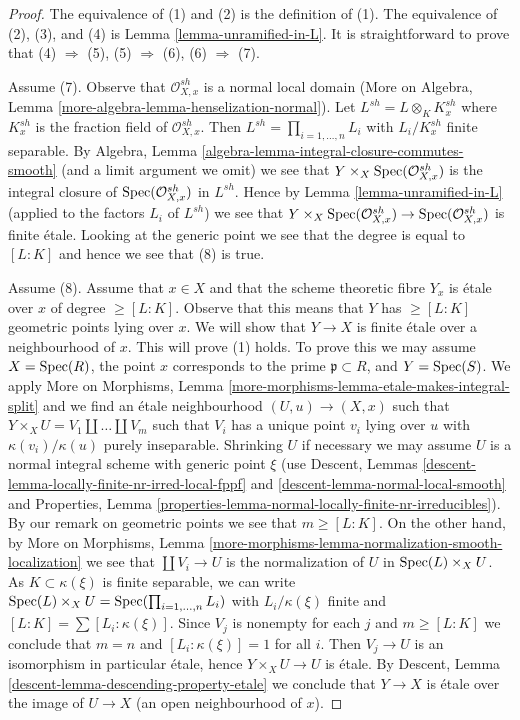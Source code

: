 \begin{proof}
The equivalence of (1) and (2) is the definition of (1).
The equivalence of (2), (3), and (4) is Lemma \ref{lemma-unramified-in-L}.
It is straightforward to prove that (4) $\Rightarrow$ (5),
(5) $\Rightarrow$ (6), (6) $\Rightarrow$ (7).

\medskip\noindent
Assume (7). Observe that $\mathcal{O}_{X, x}^{sh}$ is a normal local domain
(More on Algebra, Lemma \ref{more-algebra-lemma-henselization-normal}).
Let $L^{sh} = L \otimes_K K_x^{sh}$ where $K_x^{sh}$ is the fraction field
of $\mathcal{O}_{X, x}^{sh}$. Then $L^{sh} = \prod_{i = 1, \ldots, n} L_i$
with $L_i/K_x^{sh}$ finite separable. By
Algebra, Lemma \ref{algebra-lemma-integral-closure-commutes-smooth}
(and a limit argument we omit)
we see that $Y \times_X \mathop{\mathrm{Spec}}(\mathcal{O}_{X, x}^{sh})$
is the integral closure of $\mathop{\mathrm{Spec}}(\mathcal{O}_{X, x}^{sh})$ in $L^{sh}$.
Hence by Lemma \ref{lemma-unramified-in-L} (applied to the factors
$L_i$ of $L^{sh}$) we see that
$Y \times_X \mathop{\mathrm{Spec}}(\mathcal{O}_{X, x}^{sh}) \to \mathop{\mathrm{Spec}}(\mathcal{O}_{X, x}^{sh})$
is finite \'etale. Looking at the generic point we see that
the degree is equal to $[L : K]$ and hence we see that (8) is true.

\medskip\noindent
Assume (8). Assume that $x \in X$ and that the scheme theoretic fibre $Y_x$
is \'etale over $x$ of degree $\geq [L : K]$. Observe that this means
that $Y$ has $\geq [L : K]$ geometric points lying over $x$.
We will show that $Y \to X$ is finite \'etale over a neighbourhood of $x$.
This will prove (1) holds.
To prove this we may assume $X = \mathop{\mathrm{Spec}}(R)$, the point $x$ corresponds to
the prime $\mathfrak p \subset R$, and $Y = \mathop{\mathrm{Spec}}(S)$. We apply
More on Morphisms,
Lemma \ref{more-morphisms-lemma-etale-makes-integral-split} and we find an
\'etale neighbourhood $(U, u) \to (X, x)$ such that
$Y \times_X U = V_1 \amalg \ldots \amalg V_m$ such that $V_i$
has a unique point $v_i$ lying over $u$ with $\kappa(v_i)/\kappa(u)$
purely inseparable. Shrinking $U$ if necessary we may assume $U$ is
a normal integral scheme with generic point $\xi$ (use
Descent, Lemmas \ref{descent-lemma-locally-finite-nr-irred-local-fppf} and
\ref{descent-lemma-normal-local-smooth} and
Properties, Lemma \ref{properties-lemma-normal-locally-finite-nr-irreducibles}).
By our remark on geometric points we see that $m \geq [L : K]$.
On the other hand, by More on Morphisms, Lemma
\ref{more-morphisms-lemma-normalization-smooth-localization}
we see that $\coprod V_i \to U$ is the normalization of $U$ in
$\mathop{\mathrm{Spec}}(L) \times_X U$. As $K \subset \kappa(\xi)$ is finite separable,
we can write $\mathop{\mathrm{Spec}}(L) \times_X U = \mathop{\mathrm{Spec}}(\prod_{i = 1, \ldots, n} L_i)$
with $L_i/\kappa(\xi)$ finite and $[L : K] = \sum [L_i : \kappa(\xi)]$.
Since $V_j$ is nonempty for each $j$ and $m \geq [L : K]$
we conclude that $m = n$ and $[L_i : \kappa(\xi)] = 1$
for all $i$. Then $V_j \to U$ is an isomorphism in particular
\'etale, hence $Y \times_X U \to U$ is \'etale. By
Descent, Lemma \ref{descent-lemma-descending-property-etale}
we conclude that $Y \to X$ is \'etale over the
image of $U \to X$ (an open neighbourhood of $x$).


\end{proof}
